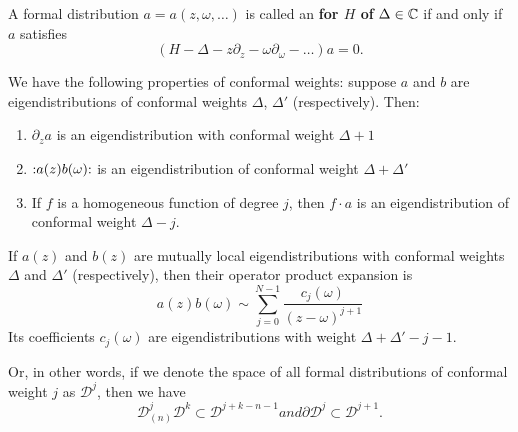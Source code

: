 A formal distribution $a=a(z,\omega,\dots)$ is called an 
 \textbf{for $H$ of}  
$\Delta\in\mathbb{C}$ if and only if $a$ satisfies
\begin{equation}
(H-\Delta-z\partial_{z}-\omega\partial_{\omega}-\dots)a=0.
\end{equation}

We have the following properties of conformal weights: suppose $a$ and $b$ are
eigendistributions of conformal weights $\Delta$, $\Delta'$ (respectively). Then:
\begin{enumerate}
\item $\partial_{z}a$ is an eigendistribution with conformal weight $\Delta+1$
\item $\mathop{:}\nolimits\!a(z)b(\omega)\!\mathop{:}\nolimits$ is an eigendistribution of conformal weight $\Delta+\Delta'$
\item If $f$ is a homogeneous function of degree $j$, then $f\cdot a$ is an 
eigendistribution of conformal weight $\Delta-j$.
\end{enumerate}

\label{cor:bookKeeping:OPE}
If $a(z)$ and $b(z)$ are mutually local eigendistributions with conformal weights 
$\Delta$ and $\Delta'$ (respectively), then their operator product expansion is
\begin{equation}
a(z)b(\omega)\sim\sum^{N-1}_{j=0}\frac{c_{j}(\omega)}{(z-\omega)^{j+1}}
\end{equation}
Its coefficients $c_{j}(\omega)$ are eigendistributions with weight 
$\Delta+\Delta'-j-1$. 

Or, in other words, if we denote the space of all formal distributions of 
conformal weight $j$ as $\mathcal{D}^{j}$, then we have
\begin{subequations}
\begin{equation}
\mathcal{D}^{j}_{(n)}\mathcal{D}^{k}\subset\mathcal{D}^{j+k-n-1}
\end{equation}
and
\begin{equation}
\partial\mathcal{D}^{j}\subset\mathcal{D}^{j+1}.
\end{equation}
\end{subequations}

